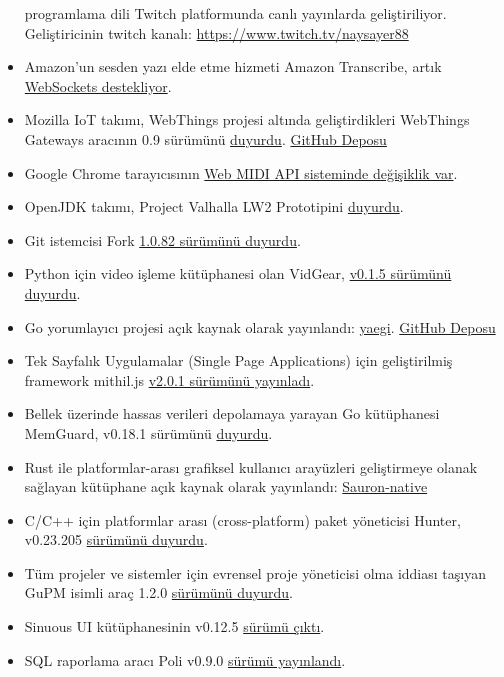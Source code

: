 \documentclass[11pt]{article}
\begin{document}
\begin{itemize}
programlama dili Twitch platformunda canlı yayınlarda geliştiriliyor.
Geliştiricinin twitch kanalı: \url{https://www.twitch.tv/naysayer88}
\item Amazon'un sesden yazı elde etme hizmeti Amazon Transcribe, artık \href{https://aws.amazon.com/blogs/aws/amazon-transcribe-streaming-now-supports-websockets/}{WebSockets
destekliyor}.
\item Mozilla IoT takımı, WebThings projesi altında geliştirdikleri WebThings
Gateways aracının 0.9 sürümünü \href{https://venturebeat.com/2019/07/25/mozilla-debuts-webthings-gateway-open-source-router-firmware-for-turris-omnia/}{duyurdu}. \href{https://github.com/mozilla-iot/gateway}{GitHub Deposu}
\item Google Chrome tarayıcısının \href{https://medium.com/kulak/changes-in-web-midi-api-in-chrome-in-2019-4e410ec76af}{Web MIDI API sisteminde değişiklik var}.
\item OpenJDK takımı, Project Valhalla LW2 Prototipini \href{https://www.infoq.com/news/2019/07/valhalla-openjdk-lw2-released/}{duyurdu}.
\item Git istemcisi Fork \href{https://fork.dev/releasenotes}{1.0.82 sürümünü duyurdu}.
\item Python için video işleme kütüphanesi olan VidGear, \href{https://github.com/abhiTronix/vidgear/releases/tag/vidgear-0.1.5}{v0.1.5 sürümünü duyurdu}.
\item Go yorumlayıcı projesi açık kaynak olarak yayınlandı: \href{https://blog.containo.us/announcing-yaegi-263a1e2d070a}{yaegi}. \href{https://github.com/containous/yaegi}{GitHub Deposu}
\item Tek Sayfalık Uygulamalar (Single Page Applications) için geliştirilmiş
framework mithil.js \href{https://github.com/MithrilJS/mithril.js/releases/tag/v2.0.1}{v2.0.1 sürümünü yayınladı}.
\item Bellek üzerinde hassas verileri depolamaya yarayan Go kütüphanesi MemGuard,
v0.18.1 sürümünü \href{https://github.com/awnumar/memguard/releases/tag/v0.18.1}{duyurdu}.
\item Rust ile platformlar-arası grafiksel kullanıcı arayüzleri geliştirmeye
olanak sağlayan kütüphane açık kaynak olarak yayınlandı: \href{https://github.com/ivanceras/sauron-native}{Sauron-native}
\item C/C++ için platformlar arası (cross-platform) paket yöneticisi Hunter,
v0.23.205 \href{https://github.com/ruslo/hunter/releases/tag/v0.23.205}{sürümünü duyurdu}.
\item Tüm projeler ve sistemler için evrensel proje yöneticisi olma iddiası
taşıyan GuPM isimli araç 1.2.0 \href{https://github.com/azukaar/GuPM/releases/tag/1.2.0}{sürümünü duyurdu}.
\item Sinuous UI kütüphanesinin v0.12.5 \href{https://github.com/luwes/sinuous/releases/tag/v0.12.5}{sürümü çıktı}.
\item SQL raporlama aracı Poli v0.9.0 \href{https://github.com/shzlw/poli/releases/tag/v0.9.0}{sürümü yayınlandı}.
\end{itemize}
\end{document}
